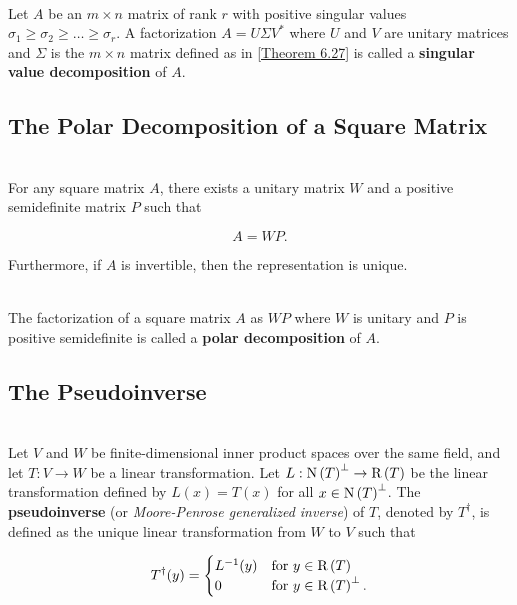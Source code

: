 \begin{definition}
	\hfill\\
	Let $A$ be an $m \times n$ matrix of rank $r$ with positive singular values $\sigma_1 \geq \sigma_2 \geq \dots \geq \sigma_r$. A factorization $A = U\Sigma V^*$ where $U$ and $V$ are unitary matrices and $\Sigma$ is the $m \times n$ matrix defined as in \autoref{Theorem 6.27} is called a \textbf{singular value decomposition} of $A$.
\end{definition}

\subsection*{The Polar Decomposition of a Square Matrix}

\begin{theorem}
	\hfill\\
	For any square matrix $A$, there exists a unitary matrix $W$ and a positive semidefinite matrix $P$ such that

	\[A = WP.\]

	Furthermore, if $A$ is invertible, then the representation is unique.
\end{theorem}

\begin{definition}
	\hfill\\
	The factorization of a square matrix $A$ as $WP$ where $W$ is unitary and $P$ is positive semidefinite is called a \textbf{polar decomposition} of $A$.
\end{definition}

\subsection*{The Pseudoinverse}

\begin{definition}
	\hfill\\
	Let $V$ and $W$ be finite-dimensional inner product spaces over the same field, and let $T: V \to W$ be a linear transformation. Let $L: \text{N}\left(T\right)^\perp \to \text{R}\left(T\right)$ be the linear transformation defined by $L(x) = T(x)$ for all $x \in \text{N}\left(T\right)^\perp$. The \textbf{pseudoinverse} (or \textit{Moore-Penrose generalized inverse}) of $T$, denoted by $T^\dagger$, is defined as the unique linear transformation from $W$ to $V$ such that

	\[T^\dagger(y) = \begin{cases}
			L^{-1}(y) & \text{for}\ y \in \text{R}\left(T\right)        \\
			0         & \text{for}\ y \in \text{R}\left(T\right)^\perp.
		\end{cases}\]
\end{definition}


